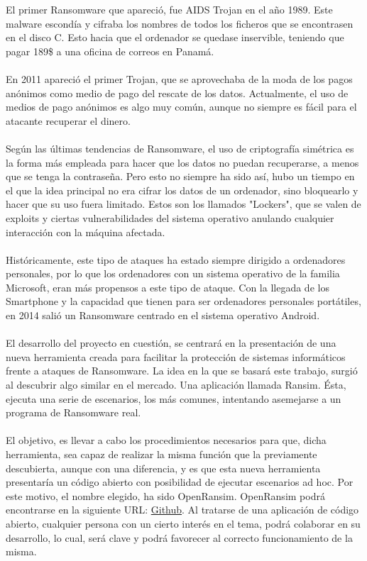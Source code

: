 \documentclass[a4paper,12pt]{article}
\begin{document}
El primer Ransomware que apareció, fue AIDS Trojan en el año 1989. Este malware escondía y cifraba los nombres de todos los ficheros que se encontrasen en el disco C. Esto hacia que el ordenador se quedase inservible, teniendo que pagar 189\$ a una oficina de correos en Panamá.\\\\
En 2011 apareció el primer Trojan, que se aprovechaba de la moda de los pagos anónimos como medio de pago del rescate de los datos. Actualmente, el uso de medios de pago anónimos es algo muy común, aunque no siempre es fácil para el atacante recuperar el dinero.\\\\
Según las últimas tendencias de Ransomware, el uso de criptografía simétrica es la forma más empleada para hacer que los datos no puedan recuperarse, a menos que se tenga la contraseña. Pero esto no siempre ha sido así, hubo un tiempo en el que la idea principal no era cifrar los datos de un ordenador, sino bloquearlo y hacer que su uso fuera limitado. Estos son los llamados "Lockers", que se valen de exploits y ciertas vulnerabilidades del sistema operativo anulando cualquier interacción con la máquina afectada.\\\\
Históricamente, este tipo de ataques ha estado siempre dirigido a ordenadores personales, por lo que los ordenadores con un sistema operativo de la familia Microsoft\cite{microsoft}, eran más propensos a este tipo de ataque. Con la llegada de los Smartphone y la capacidad que tienen para ser ordenadores personales portátiles, en 2014 salió un Ransomware centrado en el sistema operativo Android\cite{android}.\\\\
El desarrollo del proyecto en cuestión, se centrará en la presentación de una nueva herramienta creada para facilitar la protección de sistemas informáticos frente a ataques de Ransomware. La idea en la que se basará este trabajo, surgió al descubrir algo similar en el mercado. Una aplicación llamada Ransim. Ésta, ejecuta una serie de escenarios, los más comunes, intentando asemejarse a un programa de Ransomware real.\\\\
El objetivo, es llevar a cabo los procedimientos necesarios para que, dicha herramienta, sea capaz de realizar la misma función que la previamente descubierta, aunque con una diferencia, y es que esta nueva herramienta presentaría un código abierto con posibilidad de ejecutar escenarios ad hoc. Por este motivo, el nombre elegido, ha sido OpenRansim. OpenRansim podrá encontrarse en la siguiente URL: \href{https://github.com/iserranos/OpenRansim}{Github}. 
Al tratarse de una aplicación de código abierto, cualquier persona con un cierto interés en el tema, podrá colaborar en su desarrollo, lo cual, será clave y podrá favorecer al correcto funcionamiento de la misma.
\end{document}
